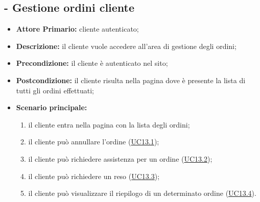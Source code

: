 \subsection{ - Gestione ordini cliente}
\begin{itemize}
    \item \textbf{Attore Primario:} cliente autenticato;
    \item \textbf{Descrizione:} il cliente vuole accedere all'area di gestione degli ordini;
    \item \textbf{Precondizione:} il cliente è autenticato nel sito;
    \item \textbf{Postcondizione:} il cliente risulta nella pagina dove è presente la lista di tutti gli ordini effettuati;
    \item \textbf{Scenario principale:}
          \begin{enumerate}
              \item il cliente entra nella pagina con la lista degli ordini;
              \item il cliente può annullare l'ordine (\hyperref[UC13.1]{UC13.1});
              \item il cliente può richiedere assistenza per un ordine (\hyperref[UC13.2]{UC13.2});
              \item il cliente può richiedere un reso (\hyperref[UC13.3]{UC13.3});
              \item il cliente può visualizzare il riepilogo di un determinato ordine (\hyperref[UC13.4]{UC13.4}).
          \end{enumerate}
\end{itemize}

\stepsubUserCase
